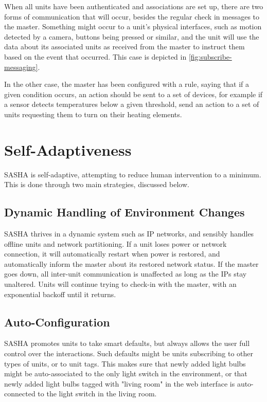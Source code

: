 When all units have been authenticated and associations are set up, there are two forms of communication that will occur, besides the regular check in messages to the master. Something might occur to a unit's physical interfaces, such as motion detected by a camera, buttons being pressed or similar, and the unit will use the data about its associated units as received from the master to instruct them based on the event that occurred. This case is depicted in \autoref{fig:subscribe-messaging}.

In the other case, the master has been configured with a rule, saying that if a given condition occurs, an action should be sent to a set of devices, for example if a sensor detects temperatures below a given threshold, send an action to a set of units requesting them to turn on their heating elements.


\section{Self-Adaptiveness}
SASHA is self-adaptive, attempting to reduce human intervention to a minimum. This is done through two main strategies, discussed below.

\subsection{Dynamic Handling of Environment Changes}
SASHA thrives in a dynamic system such as IP networks, and sensibly handles offline units and network partitioning. If a unit loses power or network connection, it will automatically restart when power is restored, and automatically inform the master about its restored network status. If the master goes down, all inter-unit communication is unaffected as long as the IPs stay unaltered. Units will continue trying to check-in with the master, with an exponential backoff until it returns.

\subsection{Auto-Configuration}
SASHA promotes units to take smart defaults, but always allows the user full control over the interactions. Such defaults might be units subscribing to other types of units, or to unit tags. This makes sure that newly added light bulbs might be auto-associated to the only light switch in the environment, or that newly added light bulbs tagged with "living room" in the web interface is auto-connected to the light switch in the living room.

